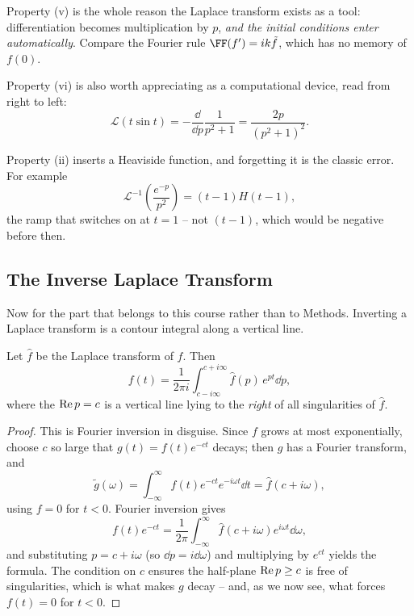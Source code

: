 \documentclass[a4paper]{scrartcl}
\begin{document}
Property (v) is the whole reason the Laplace transform exists as a tool: differentiation becomes multiplication by $p$, \emph{and the initial conditions enter automatically}. Compare the Fourier rule $\FF(f') = ik\tilde f$, which has no memory of $f(0)$.

Property (vi) is also worth appreciating as a computational device, read from right to left:
$$
\mathcal L(t \sin t) = -\frac{\dd}{\dd p} \frac{1}{p^2 + 1} = \frac{2p}{(p^2 + 1)^2}.
$$

\begin{example}
	Property (ii) inserts a Heaviside function, and forgetting it is the classic error. For example
	$$
	\mathcal{L}^{-1}\left(\frac{e^{-p}}{p^2}\right) = (t - 1)H(t - 1),
	$$
	the ramp that switches on at $t = 1$ -- not $(t-1)$, which would be negative before then.
\end{example}

\subsection{The Inverse Laplace Transform}

Now for the part that belongs to this course rather than to Methods. Inverting a Laplace transform is a contour integral along a vertical line.

\begin{theorem}
	Let $\hat f$ be the Laplace transform of $f$. Then
	$$
	f(t) = \frac{1}{2\pi i} \int_{c - i\infty}^{c + i\infty} \hat f(p) \, e^{pt} \dd p,
	$$
	where the  $\operatorname{Re} p = c$ is a vertical line lying to the \emph{right} of all singularities of $\hat f$.
\end{theorem}
\begin{proof}
	This is Fourier inversion in disguise. Since $f$ grows at most exponentially, choose $c$ so large that $g(t) = f(t) e^{-ct}$ decays; then $g$ has a Fourier transform, and
	$$
	\tilde g(\omega) = \int_{-\infty}^\infty f(t) e^{-ct} e^{-i\omega t} \dd t = \hat f(c + i\omega),
	$$
	using $f = 0$ for $t < 0$. Fourier inversion gives
	$$
	f(t) e^{-ct} = \frac{1}{2\pi}\int_{-\infty}^\infty \hat f(c + i\omega) e^{i\omega t} \dd \omega,
	$$
	and substituting $p = c + i\omega$ (so $\dd p = i \dd \omega$) and multiplying by $e^{ct}$ yields the formula. The condition on $c$ ensures the half-plane $\operatorname{Re} p \geq c$ is free of singularities, which is what makes $g$ decay -- and, as we now see, what forces $f(t) = 0$ for $t < 0$.
\end{proof}
\end{document}
